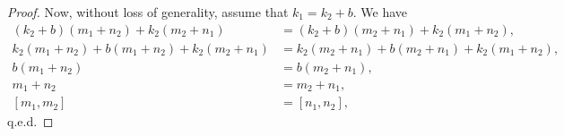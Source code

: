 \begin{problem}
\begin{enumerate}
\begin{proof}
                Now, without loss of generality, assume that $k_1 = k_2 + b$. We have
                \begin{align*}
                    (k_2 + b)(m_1 + n_2) + k_2(m_2 + n_1) &= (k_2 + b)(m_2 + n_1) + k_2(m_1 + n_2),\\
                    k_2(m_1 + n_2) + b(m_1 + n_2) + k_2(m_2 + n_1) &= k_2(m_2 + n_1) + b(m_2 + n_1) + k_2(m_1 + n_2),\\
                    b(m_1 + n_2) &= b(m_2 + n_1),\\
                    m_1 + n_2 &= m_2 + n_1,\\
                    [m_1,m_2] &= [n_1, n_2],
                \end{align*}
                q.e.d.
            \end{proof}
    \end{enumerate}
\end{problem}


